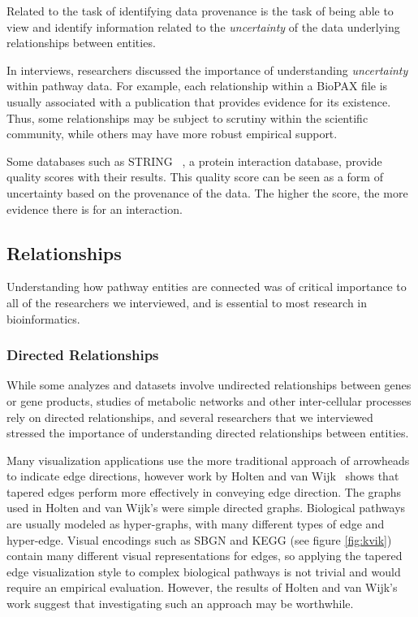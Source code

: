 \documentclass[journal]{vgtc}                %
\begin{document}
Related to the task of identifying data provenance is the task of being able to view and identify information related to the \textit{uncertainty} of the data underlying relationships between entities.

In interviews, researchers discussed the importance of understanding \emph{uncertainty} within pathway data. For example, each relationship within a BioPAX file is usually associated with a publication that provides evidence for its existence. Thus, some relationships may be subject to scrutiny within the scientific community, while others may have more robust empirical support.

Some databases such as STRING~\cite{STRING2005} , a protein interaction database, provide quality scores with their results. This quality score can be seen as a form of uncertainty based on the provenance of the data.
The higher the score, the more evidence there is for an interaction.

\subsection{Relationships}

Understanding how pathway entities are connected was of critical importance to all of the researchers we interviewed, and is essential to most research in bioinformatics.

\subsubsection{Directed Relationships}

While some analyzes and datasets involve undirected relationships between genes or gene products, studies of metabolic networks and other inter-cellular processes rely on directed relationships, and several researchers that we interviewed stressed the importance of understanding directed relationships between entities.

Many visualization applications use the more traditional approach of arrowheads to indicate edge directions, however work by Holten and van Wijk~\cite{Holten2009} shows that tapered edges perform more effectively in conveying edge direction. The graphs used in Holten and van Wijk's were simple directed graphs. Biological pathways are usually modeled as hyper-graphs, with many different types of edge and hyper-edge. Visual encodings such as SBGN and KEGG (see figure \ref{fig:kvik}) contain many different visual representations for edges, so applying the tapered edge visualization style to complex biological pathways is not trivial and would require an empirical evaluation. However, the results of Holten and van Wijk's work suggest that investigating such an approach may be worthwhile.
\end{document}
